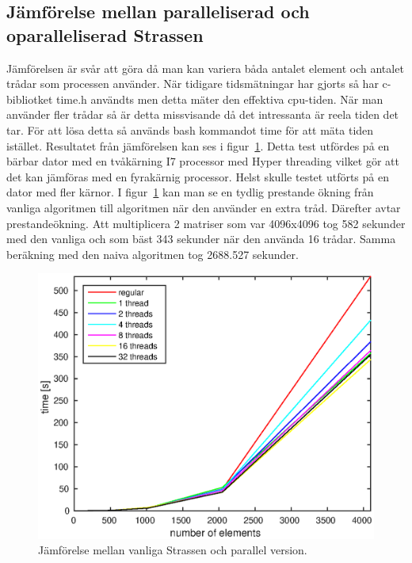 \subsection{Jämförelse mellan paralleliserad och oparalleliserad Strassen}
Jämförelsen är svår att göra då man kan variera båda antalet element och antalet trådar som processen använder. När tidigare tidsmätningar har gjorts så har c-bibliotket time.h användts men detta mäter den effektiva cpu-tiden. När man använder fler trådar så är detta missvisande då det intressanta är reela tiden det tar. För att lösa detta så används bash kommandot time för att mäta tiden istället. Resultatet från jämförelsen kan ses i figur~\ref{fig:threads}. Detta test utfördes på en bärbar dator med en tvåkärning I7 processor med Hyper threading vilket gör att det kan jämföras med en fyrakärnig processor. Helst skulle testet utförts på en dator med fler kärnor. I figur~\ref{fig:threads} kan man se en tydlig prestande ökning från vanliga algoritmen till algoritmen när den använder en extra tråd. Därefter avtar prestandeökning. Att multiplicera 2 matriser som var 4096x4096 tog 582 sekunder med den vanliga och som bäst 343 sekunder när den använda 16 trådar. Samma beräkning med den naiva algoritmen tog 2688.527 sekunder. 

\begin{figure}[H]
	\begin{center}
		\includegraphics[scale=0.6]{martin-tex/threads_test.eps}
	\end{center}
	\caption{Jämförelse mellan vanliga Strassen och parallel version.}
	\label{fig:threads}
\end{figure}


